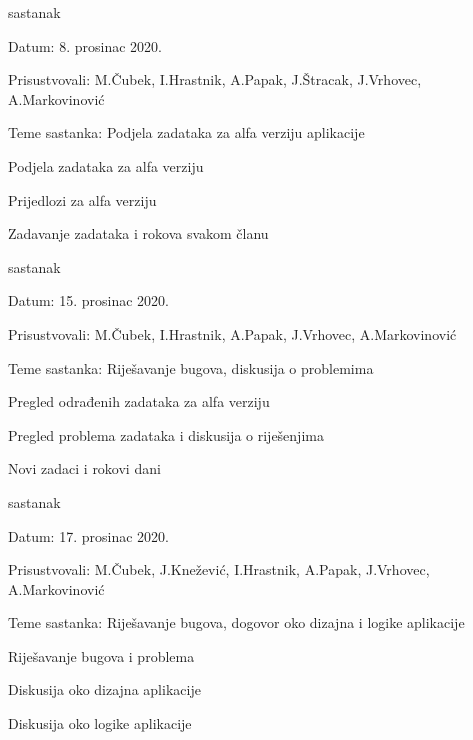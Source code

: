 \begin{packed_enum}
			\item  sastanak
			\item[] \begin{packed_item}
				\item Datum: 8. prosinac 2020.
				\item Prisustvovali: M.Čubek, I.Hrastnik, A.Papak, J.Štracak, J.Vrhovec, A.Markovinović
				\item Teme sastanka: Podjela zadataka za alfa verziju aplikacije
				\begin{packed_item}
					\item Podjela zadataka za alfa verziju
					\item Prijedlozi za alfa verziju
					\item Zadavanje zadataka i rokova svakom članu
					\item
				\end{packed_item}
			\end{packed_item}
			
			\item  sastanak
			\item[] \begin{packed_item}
				\item Datum: 15. prosinac 2020.
				\item Prisustvovali: M.Čubek, I.Hrastnik, A.Papak, J.Vrhovec, A.Markovinović
				\item Teme sastanka: Riješavanje bugova, diskusija o problemima
				\begin{packed_item}
					\item Pregled odrađenih zadataka za alfa verziju
					\item Pregled problema zadataka i diskusija o riješenjima
					\item Novi zadaci i rokovi dani
				\end{packed_item}
			\end{packed_item}
			
			\item  sastanak
			\item[] \begin{packed_item}
				\item Datum: 17. prosinac 2020.
				\item Prisustvovali: M.Čubek, J.Knežević, I.Hrastnik, A.Papak,  J.Vrhovec, A.Markovinović
				\item Teme sastanka: Riješavanje bugova, dogovor oko dizajna i logike aplikacije
				\begin{packed_item}
					\item Riješavanje bugova i problema
					\item Diskusija oko dizajna aplikacije
					\item Diskusija oko logike aplikacije
				\end{packed_item}
			\end{packed_item}
					
			
		\end{packed_enum}
		
